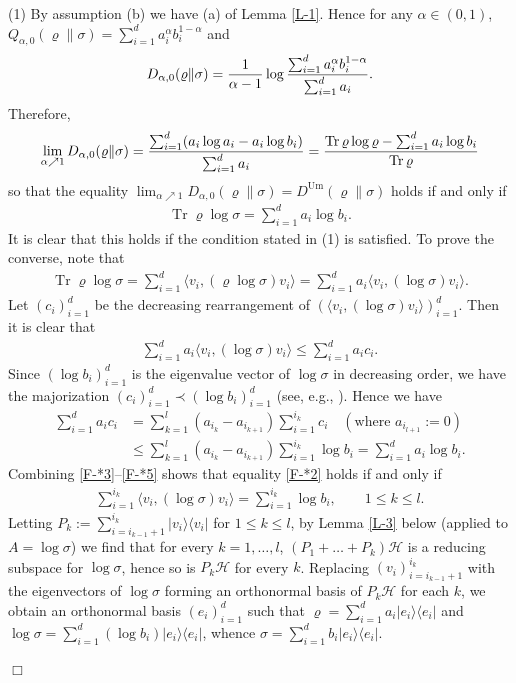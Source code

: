 \documentclass[unsortedaddress,superscriptaddress,pra,notitlepage]{revtex4}
\newenvironment{proof}[1][Proof]{\begin{trivlist}
\item[\hskip \labelsep {\bfseries #1}]}{\hfill$\Box$\end{trivlist}}
\def\rho{\varrho}
\def\cH{\mathcal{H}}
\def\<{\langle}
\def\>{\rangle}
\def\Um{\mathrm{Um}}
\def\<{\langle}
\def\>{\rangle}
\DeclareMathOperator{\Tr}{Tr}
\begin{document}
\begin{proof}
(1)\enspace
By assumption (b) we have (a) of Lemma \ref{L-1}. Hence for any $\alpha\in(0,1)$,
$Q_{\alpha,0}(\rho\|\sigma)=\sum_{i=1}^da_i^\alpha b_i^{1-\alpha}$ and
\[
D_{\alpha,0}(\rho\|\sigma)
={1\over\alpha-1}\log{\sum_{i=1}^da_i^\alpha b_i^{1-\alpha}\over\sum_{i=1}^da_i}.
\]
Therefore,
\[
\lim_{\alpha\nearrow1}D_{\alpha,0}(\rho\|\sigma)
={\sum_{i=1}^d(a_i\log a_i-a_i\log b_i)\over\sum_{i=1}^da_i}
={\Tr\rho\log\rho-\sum_{i=1}^da_i\log b_i\over\Tr\rho}
\]
so that the equality $\lim_{\alpha\nearrow1}D_{\alpha,0}(\rho\|\sigma)=D^\Um(\rho\|\sigma)$
holds if and only if
\begin{align}\label{F-*2}
\Tr\rho\log\sigma=\sum_{i=1}^da_i\log b_i.
\end{align}
It is clear that this holds if the condition stated in (1) is satisfied. To prove the converse,
note that
\begin{align}\label{F-*3}
\Tr\rho\log\sigma=\sum_{i=1}^d\<v_i,(\rho\log\sigma)v_i\>
=\sum_{i=1}^da_i\<v_i,(\log\sigma)v_i\>.
\end{align}
Let $(c_i)_{i=1}^d$ be the decreasing rearrangement of $(\<v_i,(\log\sigma)v_i\>)_{i=1}^d$.
Then it is clear that
\begin{align}\label{F-*4}
\sum_{i=1}^da_i\<v_i,(\log\sigma)v_i\>\le\sum_{i=1}^da_ic_i.
\end{align}
Since $(\log b_i)_{i=1}^d$ is the eigenvalue vector of $\log\sigma$ in decreasing order,
we have the majorization $(c_i)_{i=1}^d\prec(\log b_i)_{i=1}^d$ (see, e.g., 
\cite[Exercise II.1.12]{Bhatia}). Hence we have
\begin{equation}\label{F-*5}
\begin{aligned}
\sum_{i=1}^da_ic_i
&=\sum_{k=1}^l(a_{i_k}-a_{i_{k+1}})\sum_{i=1}^{i_k}c_i\quad
(\mbox{where $a_{i_{l+1}}:=0$}) \\
&\le\sum_{k=1}^l(a_{i_k}-a_{i_{k+1}})\sum_{i=1}^{i_k}\log b_i
=\sum_{i=1}^da_i\log b_i.
\end{aligned}
\end{equation}
Combining \eqref{F-*3}--\eqref{F-*5} shows that equality \eqref{F-*2} holds if and only if
\begin{align*}%
\sum_{i=1}^{i_k}\<v_i,(\log\sigma)v_i\>=\sum_{i=1}^{i_k}\log b_i,\qquad1\le k\le l.
\end{align*}
Letting $P_k:=\sum_{i=i_{k-1}+1}^{i_k}|v_i\>\<v_i|$ for $1\le k\le l$, by Lemma \ref{L-3} below
(applied to $A=\log\sigma$) we find that for every $k=1,\ldots,l$, $(P_1+\ldots+P_k)\cH$ is
a reducing subspace for $\log\sigma$, hence so is $P_k\cH$ for every $k$. Replacing
$(v_i)_{i=i_{k-1}+1}^{i_k}$ with the eigenvectors of $\log\sigma$ forming an orthonormal
basis of $P_k\cH$ for each $k$, we obtain an orthonormal basis $(e_i)_{i=1}^d$ such that
$\rho=\sum_{i=1}^da_i|e_i\>\<e_i|$ and $\log\sigma=\sum_{i=1}^d(\log b_i)|e_i\>\<e_i|$,
whence $\sigma=\sum_{i=1}^db_i|e_i\>\<e_i|$.


\end{proof}
\end{document}
